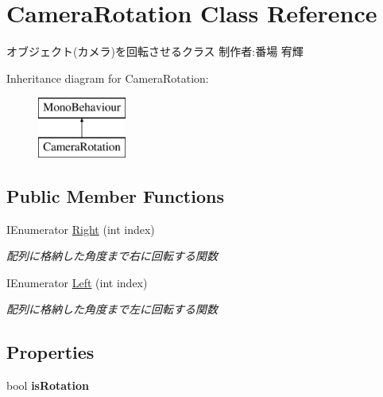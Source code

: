 \hypertarget{class_camera_rotation}{}\section{Camera\+Rotation Class Reference}
\label{class_camera_rotation}


オブジェクト(カメラ)を回転させるクラス 制作者\+:番場 宥輝  


Inheritance diagram for Camera\+Rotation\+:\begin{figure}[H]
\begin{center}
\leavevmode
\includegraphics[height=2.000000cm]{class_camera_rotation}
\end{center}
\end{figure}
\subsection*{Public Member Functions}
\begin{DoxyCompactItemize}
\item 
I\+Enumerator \hyperlink{class_camera_rotation_a96a7b98d4238c67c690dc8b62bbfb68b}{Right} (int index)
\begin{DoxyCompactList}\small\item\em 配列に格納した角度まで右に回転する関数 \end{DoxyCompactList}\item 
I\+Enumerator \hyperlink{class_camera_rotation_a784513a00a2d8ed9ee568b0b94b7b273}{Left} (int index)
\begin{DoxyCompactList}\small\item\em 配列に格納した角度まで左に回転する関数 \end{DoxyCompactList}\end{DoxyCompactItemize}
\subsection*{Properties}
\begin{DoxyCompactItemize}
\item 
\mbox{\label{class_camera_rotation_a01abf71f57f636fe06ee00d304688fb4}} 
bool {\bfseries is\+Rotation}
\end{DoxyCompactItemize}

